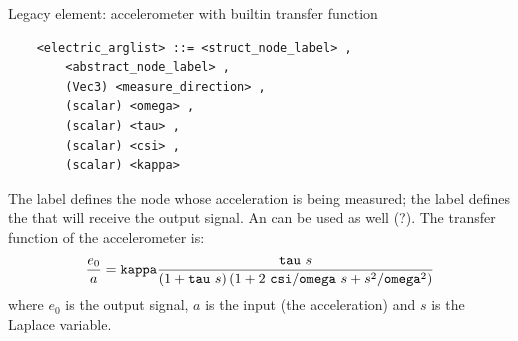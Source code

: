 \noindent
Legacy element: accelerometer with builtin transfer function
\begin{verbatim}
    <electric_arglist> ::= <struct_node_label> ,
        <abstract_node_label> ,
        (Vec3) <measure_direction> ,
        (scalar) <omega> ,
        (scalar) <tau> ,
        (scalar) <csi> ,
        (scalar) <kappa>	
\end{verbatim}
The label  defines the node whose acceleration 
is being measured; the label  defines the
 that will receive the output signal. 
An  can be used as well (?).
The transfer function of the accelerometer is:
\begin{displaymath}
    \frac{e_0}{a} = \texttt{kappa}\frac{\texttt{tau} \ s}{
        \left( 1+\texttt{tau} \ s \right)
        \left( 1+2 \ \texttt{csi}/\texttt{omega} \ s+s^2/\texttt{omega}^2 \right)
    }
\end{displaymath}
where $ e_0 $ is the output signal, $ a $ is the input (the acceleration)
and $ s $ is the Laplace variable.

